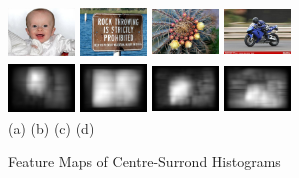 \documentclass[10pt,twocolumn,letterpaper]{article}
\newcommand{\hs}{\hspace{0.58in}}
\begin{document}
\begin{figure}[h]
    \begin{center}
    \includegraphics[width=0.7in,height=0.54in]{./Figures/CSH_image/1orig.jpg}
    \includegraphics[width=0.7in,height=0.54in]{./Figures/CSH_image/2orig.jpg}
    \includegraphics[width=0.7in,height=0.54in]{./Figures/CSH_image/3orig.jpg}
    \includegraphics[width=0.7in,height=0.54in]{./Figures/CSH_image/4orig.jpg}\\
    \includegraphics[width=0.7in,height=0.54in]{./Figures/CSH_image/1cont.jpg}
    \includegraphics[width=0.7in,height=0.54in]{./Figures/CSH_image/2cont.jpg}
    \includegraphics[width=0.7in,height=0.54in]{./Figures/CSH_image/3cont.jpg}
    \includegraphics[width=0.7in,height=0.54in]{./Figures/CSH_image/4cont.jpg}\\
    \footnotesize \hspace{0.1cm} (a) \hs (b) \hs  (c) \hs (d) \\
    \caption{Feature Maps of Centre-Surrond Histograms} \label{Fig:RegionalFeatureMap}
    \end{center}
\end{figure}
\end{document}
